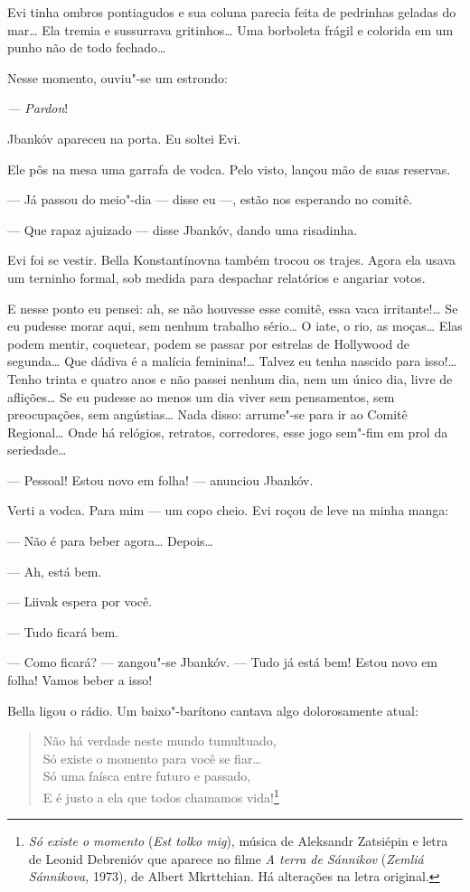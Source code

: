 Evi tinha ombros pontiagudos e sua coluna parecia feita de pedrinhas
geladas do mar\ldots{} Ela tremia e sussurrava gritinhos\ldots{} Uma borboleta
frágil e colorida em um punho não de todo fechado\ldots{}

Nesse momento, ouviu"-se um estrondo:

\emph{--- Pardon}!

Jbankóv apareceu na porta. Eu soltei Evi.

Ele pôs na mesa uma garrafa de vodca. Pelo visto, lançou mão de suas
reservas.

--- Já passou do meio"-dia --- disse eu ---, estão
nos esperando no comitê.

--- Que rapaz ajuizado --- disse Jbankóv, dando uma
risadinha.

Evi foi se vestir. Bella Konstantínovna também trocou os trajes. Agora
ela usava um terninho formal, sob medida para despachar relatórios e
angariar votos.

E nesse ponto eu pensei: ah, se não houvesse esse comitê, essa vaca
irritante!\ldots{} Se eu pudesse morar aqui, sem nenhum trabalho sério\ldots{} O
iate, o rio, as moças\ldots{} Elas podem mentir, coquetear, podem se passar
por estrelas de Hollywood de segunda\ldots{} Que dádiva é a malícia
feminina!\ldots{} Talvez eu tenha nascido para isso!\ldots{} Tenho trinta e quatro
anos e não passei nenhum dia, nem um único dia, livre de aflições\ldots{} Se
eu pudesse ao menos um dia viver sem pensamentos, sem preocupações, sem
angústias\ldots{} Nada disso: arrume"-se para ir ao Comitê Regional\ldots{} Onde há
relógios, retratos, corredores, esse jogo sem"-fim em prol da
seriedade\ldots{}

--- Pessoal! Estou novo em folha! --- anunciou Jbankóv.

Verti a vodca. Para mim --- um copo cheio. Evi roçou de leve na
minha manga:

--- Não é para beber agora\ldots{} Depois\ldots{}

--- Ah, está bem.

--- Liivak espera por você.

--- Tudo ficará bem.

--- Como ficará? --- zangou"-se Jbankóv. --- Tudo já
está bem! Estou novo em folha! Vamos beber a isso!

Bella ligou o rádio. Um baixo"-barítono cantava algo dolorosamente atual:

\begin{verse}
Não há verdade neste mundo tumultuado,\\
Só existe o momento para você se fiar\ldots{}\\
Só uma faísca entre futuro e passado,\\
E é justo a ela que todos chamamos vida!\footnote{\emph{Só existe o
  momento} (\emph{Est tolko mig}), música de Aleksandr Zatsiépin e
  letra de Leonid Debrenióv que aparece no filme \emph{A terra
  de Sánnikov} (\emph{Zemliá Sánnikova,} 1973), de Albert
  Mkrttchian. Há alterações na letra original.}
\end{verse}

